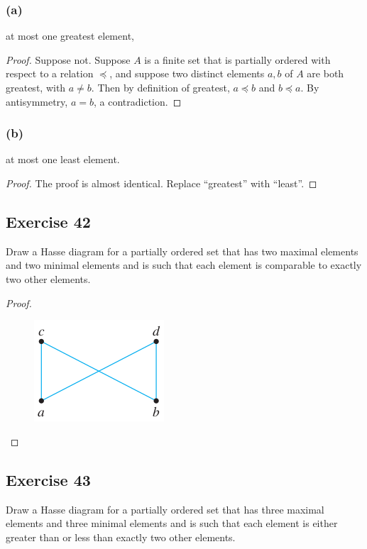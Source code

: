 \documentclass[14pt]{extarticle}
\begin{document}
\subsubsection{(a)}
at most one greatest element,

\begin{proof}
Suppose not. Suppose $A$ is a finite set that is partially ordered with respect to a relation \(\preceq\), and suppose 
two distinct elements \(a, b\) of $A$ are both greatest, with \(a \neq b\). Then by definition of greatest, \(a 
\preceq b\) and \(b \preceq a\). By antisymmetry, \(a = b\), a contradiction.
\end{proof}

\subsubsection{(b)}
at most one least element.

\begin{proof}
The proof is almost identical. Replace ``greatest'' with ``least''.
\end{proof}

\subsection{Exercise 42}
Draw a Hasse diagram for a partially ordered set that has two maximal elements and two minimal elements and is such 
that each element is comparable to exactly two other elements.

\begin{proof}
\begin{figure}[ht!]
\centering
\includegraphics[scale=0.5]{../images/8.5.42.png}
\end{figure}
\end{proof}

\subsection{Exercise 43}
Draw a Hasse diagram for a partially ordered set that has three maximal elements and three minimal elements and is 
such that each element is either greater than or less than exactly two other elements.
\end{document}
